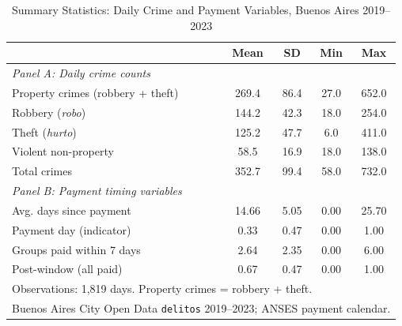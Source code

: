 \begin{table}[t]
\centering
\caption{Summary Statistics: Daily Crime and Payment Variables, Buenos Aires 2019--2023}
\label{tab:summary}
\begin{tabular}{lcccc}
\hline\hline
 & Mean & SD & Min & Max \\
\hline
\multicolumn{5}{l}{\textit{Panel A: Daily crime counts}} \\[3pt]
Property crimes (robbery + theft) & 269.4 & 86.4 & 27.0 & 652.0 \\
Robbery (\textit{robo}) & 144.2 & 42.3 & 18.0 & 254.0 \\
Theft (\textit{hurto}) & 125.2 & 47.7 & 6.0 & 411.0 \\
Violent non-property & 58.5 & 16.9 & 18.0 & 138.0 \\
Total crimes & 352.7 & 99.4 & 58.0 & 732.0 \\
[6pt]
\multicolumn{5}{l}{\textit{Panel B: Payment timing variables}} \\[3pt]
Avg. days since payment & 14.66 & 5.05 & 0.00 & 25.70 \\
Payment day (indicator) & 0.33 & 0.47 & 0.00 & 1.00 \\
Groups paid within 7 days & 2.64 & 2.35 & 0.00 & 6.00 \\
Post-window (all paid) & 0.67 & 0.47 & 0.00 & 1.00 \\
\hline
\multicolumn{5}{l}{\footnotesize Observations: 1,819 days. Property crimes = robbery + theft.} \\
\multicolumn{5}{l}{\footnotesize Buenos Aires City Open Data \texttt{delitos} 2019--2023; ANSES payment calendar.} \\
\end{tabular}
\end{table}
